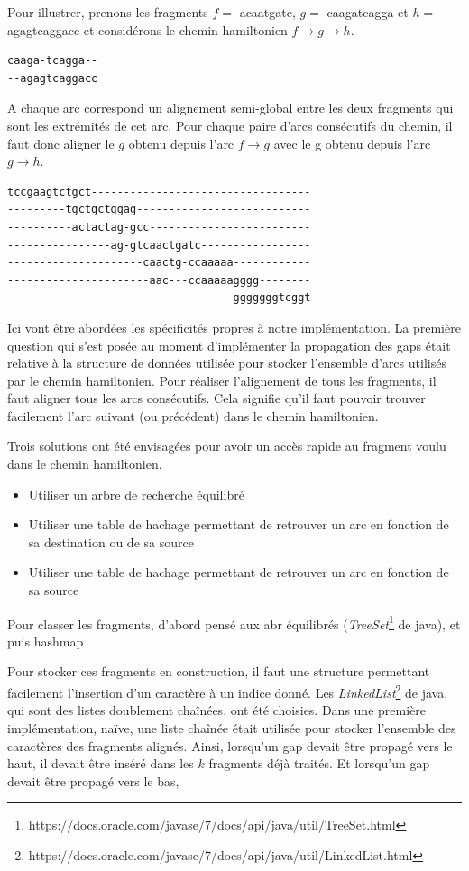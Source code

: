 \documentclass{article}
\begin{document}
Pour illustrer, prenons les fragments $f =$ acaatgatc, $g =$ caagatcagga et $h =$ agagtcaggacc et considérons le chemin hamiltonien $f \to g \to h$.


\begin{verbatim}
caaga-tcagga--
--agagtcaggacc
\end{verbatim}

A chaque arc correspond un alignement semi-global entre les deux fragments qui sont les extrémités de cet arc.
Pour chaque paire d'arcs consécutifs du chemin, il faut donc aligner le $g$ obtenu depuis l'arc $f \to g$ avec le g obtenu depuis l'arc $g \to h$.


\begin{verbatim}
tccgaagtctgct----------------------------------
---------tgctgctggag---------------------------
----------actactag-gcc-------------------------
----------------ag-gtcaactgatc-----------------
---------------------caactg-ccaaaaa------------
----------------------aac---ccaaaaagggg--------
-----------------------------------gggggggtcggt
\end{verbatim}


Ici vont être abordées les spécificités propres à notre implémentation. La première question qui s'est posée au moment d'implémenter la propagation des gaps était relative à la structure de données utilisée pour stocker l'ensemble d'arcs utilisés par le chemin hamiltonien. 
Pour réaliser l'alignement de tous les fragments, il faut aligner tous les arcs consécutifs. Cela signifie qu'il faut pouvoir trouver facilement l'arc suivant (ou précédent) dans le chemin hamiltonien.

Trois solutions ont été envisagées pour avoir un accès rapide au fragment voulu dans le chemin hamiltonien.
\begin{itemize}
\item Utiliser un arbre de recherche équilibré 
\item Utiliser une table de hachage permettant de retrouver un arc en fonction de sa destination ou de sa source
\item Utiliser une table de hachage permettant de retrouver un arc en fonction de sa source
\end{itemize}

Pour classer les fragments, d'abord pensé aux abr équilibrés (\textit{TreeSet}\footnote{https://docs.oracle.com/javase/7/docs/api/java/util/TreeSet.html} de java), et puis hashmap

Pour stocker ces fragments en construction, il faut une structure permettant facilement l'insertion d'un caractère à un indice donné. Les \textit{LinkedList}\footnote{https://docs.oracle.com/javase/7/docs/api/java/util/LinkedList.html} de java, qui sont des listes doublement chaînées, ont été choisies. Dans une première implémentation, naïve, une liste chaînée était utilisée pour stocker l'ensemble des caractères des fragments alignés. Ainsi, lorsqu'un gap devait être propagé vers le haut, il devait être inséré dans les $k$ fragments déjà traités. Et lorsqu'un gap devait être propagé vers le bas, 
\end{document}
